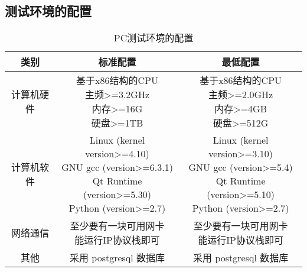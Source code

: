 \subsection{测试环境的配置}
\begin{table}[htbp]
\centering
\caption{PC测试环境的配置} \label{tab:pctest-environment}
\begin{tabular}{|c|c|c|}
    \hline
    类别 & 标准配置 & 最低配置 \\
    \hline
    计算机硬件 & \tabincell{c}{基于x86结构的CPU\\ 主频>=3.2GHz\\ 内存>=16G\\ 硬盘>=1TB} & \tabincell{c}{基于x86结构的CPU\\ 主频>=2.0GHz\\ 内存>=4GB\\ 硬盘>=512G} \\
    \hline
    计算机软件 & 
    \tabincell{c} {
        Linux (kernel version>=4.10)\\ 
        GNU gcc (version>=6.3.1)\\
        Qt Runtime (version>=5.30)\\
        Python (version>=2.7)\\
        } & 
    \tabincell{c} {
        Linux (kernel version>=3.10)\\ 
        GNU gcc (version>=5.4)\\
        Qt Runtime (version>=5.10)\\
        Python (version>=2.7)\\
        } \\
    \hline
    网络通信 & \tabincell{c}{至少要有一块可用网卡\\ 能运行IP协议栈即可} & \tabincell{c}{至少要有一块可用网卡\\ 能运行IP协议栈即可} \\
    \hline
    其他 & 采用 postgresql 数据库 & 采用 postgresql 数据库 \\
    \hline
\end{tabular}
\end{table}

